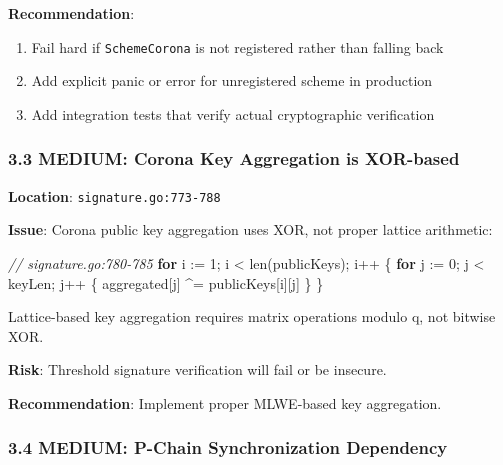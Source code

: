 \documentclass[
]{article}
\newenvironment{Shaded}{}{}
\newcommand{\BuiltInTok}[1]{\textcolor[rgb]{0.00,0.50,0.00}{#1}}
\newcommand{\CommentTok}[1]{\textcolor[rgb]{0.38,0.63,0.69}{\textit{#1}}}
\newcommand{\ControlFlowTok}[1]{\textcolor[rgb]{0.00,0.44,0.13}{\textbf{#1}}}
\newcommand{\DecValTok}[1]{\textcolor[rgb]{0.25,0.63,0.44}{#1}}
\newcommand{\NormalTok}[1]{#1}
\newcommand{\OperatorTok}[1]{\textcolor[rgb]{0.40,0.40,0.40}{#1}}
\providecommand{\tightlist}{%
  \setlength{\itemsep}{0pt}\setlength{\parskip}{0pt}}
\begin{document}
\textbf{Recommendation}:

\begin{enumerate}
\def\labelenumi{\arabic{enumi}.}
\tightlist
\item
  Fail hard if \texttt{SchemeCorona} is not registered rather than
  falling back
\item
  Add explicit panic or error for unregistered scheme in production
\item
  Add integration tests that verify actual cryptographic verification
\end{enumerate}

\subsubsection{3.3 MEDIUM: Corona Key Aggregation is
XOR-based}\label{33-medium-corona-key-aggregation-is-xor-based}

\textbf{Location}: \texttt{signature.go:773-788}

\textbf{Issue}: Corona public key aggregation uses XOR, not proper
lattice arithmetic:

\begin{Shaded}
\begin{Highlighting}[]
\CommentTok{// signature.go:780{-}785}
\ControlFlowTok{for}\NormalTok{ i }\OperatorTok{:=} \DecValTok{1}\OperatorTok{;}\NormalTok{ i }\OperatorTok{\textless{}} \BuiltInTok{len}\OperatorTok{(}\NormalTok{publicKeys}\OperatorTok{);}\NormalTok{ i}\OperatorTok{++} \OperatorTok{\{}
    \ControlFlowTok{for}\NormalTok{ j }\OperatorTok{:=} \DecValTok{0}\OperatorTok{;}\NormalTok{ j }\OperatorTok{\textless{}}\NormalTok{ keyLen}\OperatorTok{;}\NormalTok{ j}\OperatorTok{++} \OperatorTok{\{}
\NormalTok{        aggregated}\OperatorTok{[}\NormalTok{j}\OperatorTok{]} \OperatorTok{\^{}=}\NormalTok{ publicKeys}\OperatorTok{[}\NormalTok{i}\OperatorTok{][}\NormalTok{j}\OperatorTok{]}
    \OperatorTok{\}}
\OperatorTok{\}}
\end{Highlighting}
\end{Shaded}

Lattice-based key aggregation requires matrix operations modulo q, not
bitwise XOR.

\textbf{Risk}: Threshold signature verification will fail or be
insecure.

\textbf{Recommendation}: Implement proper MLWE-based key aggregation.

\subsubsection{3.4 MEDIUM: P-Chain Synchronization
Dependency}\label{34-medium-p-chain-synchronization-dependency}
\end{document}
